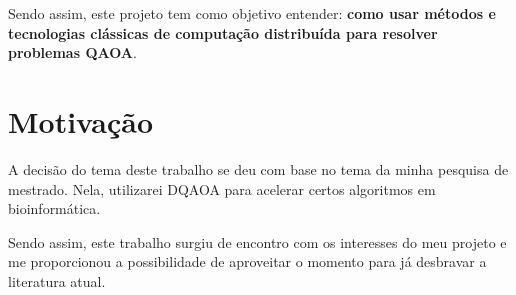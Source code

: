 \documentclass{paper}
\begin{document}
Sendo assim, este projeto tem como objetivo entender: \textbf{como usar métodos e tecnologias clássicas de computação distribuída para resolver problemas QAOA}.


\section{Motivação}

A decisão do tema deste trabalho se deu com base no tema da minha pesquisa de mestrado. Nela, utilizarei DQAOA para acelerar certos algoritmos em bioinformática. 

Sendo assim, este trabalho surgiu de encontro com os interesses do meu projeto e me proporcionou a possibilidade de aproveitar o momento para já desbravar a literatura atual.



\end{document}
